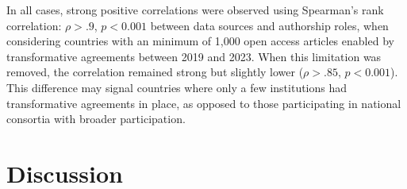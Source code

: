 \documentclass[a4paper,man,floatsintext,longtable,noextraspace,10pt]{apa6}
\begin{document}
In all cases, strong positive correlations were observed using
Spearman's rank correlation: \(\rho > .9\), \(p < 0.001\) between data
sources and authorship roles, when considering countries with an minimum
of 1,000 open access articles enabled by transformative agreements
between 2019 and 2023. When this limitation was removed, the correlation
remained strong but slightly lower (\(\rho > .85\), \(p < 0.001\)). This
difference may signal countries where only a few institutions had
transformative agreements in place, as opposed to those participating in
national consortia with broader participation.

\section{Discussion}\label{discussion}
\end{document}

